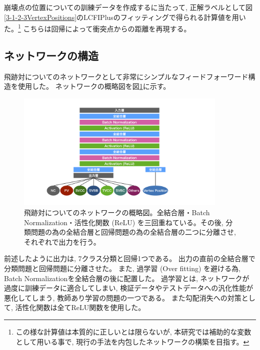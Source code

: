 崩壊点の位置についての訓練データを作成するに当たって, 正解ラベルとして図\ref{3-1-2-3VertexPositions}のLCFIPlusのフィッティングで得られる計算値を用いた。\footnote{この様な計算値は本質的に正しいとは限らないが, 本研究では補助的な変数として用いる事で, 現行の手法を内包したネットワークの構築を目指す。}
こちらは回帰によって衝突点からの距離を再現する。


\subsection{ネットワークの構造} \label{Net:PM:StructureofPM}

飛跡対についてのネットワークとして非常にシンプルなフィードフォーワード構造を使用した。
ネットワークの概略図を図\ref{3-3-1-1PairModel}に示す。

\begin{figure}[htbp]
 \centering
 \includegraphics[trim = 200 50 200 50, width=0.9\textwidth, clip]{Figure/3Networks/3-3-1-1PairModel.png}
 \caption[飛跡対についてのネットワークの概略図]{飛跡対についてのネットワークの概略図。全結合層・Batch Normalization・活性化関数 (ReLU) を三回重ねている。その後, 分類問題の為の全結合層と回帰問題の為の全結合層の二つに分離させ, それぞれで出力を行う。}
 \label{3-3-1-1PairModel}
\end{figure}

前述したように出力は, 7クラス分類と回帰1つである。
出力の直前の全結合層で分類問題と回帰問題に分離させた。
また, 過学習 (Over fitting) を避ける為, Batch Normalization\cite{BatchNormalizationpaper}を全結合層の後に配置した。
過学習とは, ネットワークが過度に訓練データに適合してしまい, 検証データやテストデータへの汎化性能が悪化してしまう, 教師あり学習の問題の一つである。
また勾配消失への対策として, 活性化関数は全てReLU関数を使用した。

\newpage
